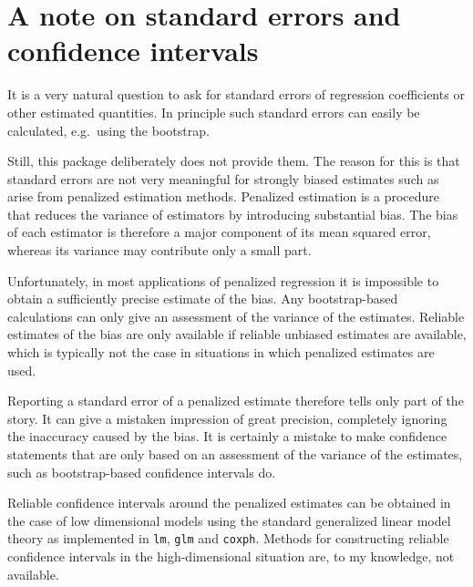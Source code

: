 \documentclass[a4paper]{article}
\newcommand{\Rfunction}[1]{{\texttt{#1}}}
\begin{document}
\section{A note on standard errors and confidence intervals}

It is a very natural question to ask for standard errors of regression coefficients or other estimated quantities. In principle such standard errors can easily be calculated, e.g.\ using the bootstrap. 

Still, this package deliberately does not provide them. The reason for this is that standard errors are not very meaningful for strongly biased estimates such as arise from penalized estimation methods. Penalized estimation is a procedure that reduces the variance of estimators by introducing substantial bias. The bias of each estimator is therefore a major component of its mean squared error, whereas its variance may contribute only a small part.

Unfortunately, in most applications of penalized regression it is impossible to obtain a sufficiently precise estimate of the bias. Any bootstrap-based calculations can only give an assessment of the variance of the estimates. Reliable estimates of the bias are only available if reliable unbiased estimates are available, which is typically not the case in situations in which penalized estimates are used.

Reporting a standard error of a penalized estimate therefore tells only part of the story. It can give a mistaken impression of great precision, completely ignoring the inaccuracy caused by the bias. It is certainly a mistake to make confidence statements that are only based on an assessment of the variance of the estimates, such as bootstrap-based confidence intervals do.

Reliable confidence intervals around the penalized estimates can be obtained in the case of low dimensional models using the standard generalized linear model theory as implemented in \Rfunction{lm}, \Rfunction{glm} and \Rfunction{coxph}. Methods for constructing reliable confidence intervals in the high-dimensional situation are, to my knowledge, not available.



\end{document}
